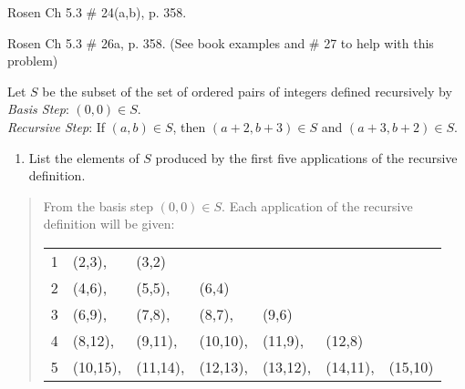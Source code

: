 \documentclass[11pt]{exam}
\begin{document}
\begin{questions}
\question[6] Rosen Ch 5.3 \# 24(a,b), p. 358.
\begin{solution}
\end{solution}


\question[6] Rosen Ch 5.3 \# 26a, p. 358. (See book examples and \#
27 to help with this problem)
\begin{solution}
Let $S$ be the subset of the set of ordered pairs of integers defined recursively by \\
\textit{Basis Step}: $(0,0) \in S$. \\
\textit{Recursive Step}: If $(a,b) \in S$, then $(a+2,b+3)\in S$ and $(a+3,b+2) \in S$. \\
\begin{enumerate}
    \item List the elements of $S$ produced by the first five applications of the recursive definition.
\end{enumerate}
\begin{quote}
    From the basis step $(0,0) \in S$.  Each application of the recursive definition will be given:

    \begin{tabular}{rllllll}
    1 & (2,3), & (3,2) \\
    2 & (4,6), & (5,5), & (6,4) \\
    3 & (6,9), & (7,8), & (8,7), & (9,6) \\
    4 & (8,12), & (9,11), & (10,10), & (11,9), & (12,8) \\
    5 & (10,15), & (11,14), & (12,13), & (13,12), & (14,11), & (15,10) \\
    \end{tabular}
\end{quote}
\end{solution}




\end{questions}
\end{document}
